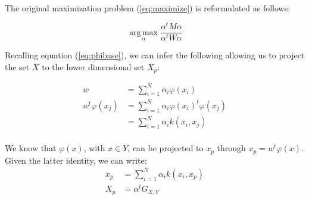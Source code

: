 \paragraph{}
The original maximization problem (\ref{eq:maximize}) is reformulated as follows:

\begin{equation*}
\label{eq:maximize2}
\operatorname*{arg\,max}_\alpha \frac{\alpha^t M \alpha}{\alpha^t W \alpha}
\end{equation*}

Recalling equation (\ref{eq:phibase}), we can infer the following allowing us to project the set $X$ to the
lower dimensional set $X_p$:

\begin{align*}
  w &= \sum_{i=1}^N \alpha_i \varphi(x_i) \\
  w^t \varphi(x_j) &= \sum_{i = 1}^N \alpha_i \varphi(x_i)^t \varphi(x_j)\\
                   &= \sum_{i = 1}^N \alpha_i k(x_i, x_j) \\
\end{align*}

We know that $\varphi(x)$, with $x \in Y$, can be projected to $x_p$ through $x_p = w^t \varphi(x)$.
Given the latter identity, we can write:
\begin{align*}
x_p &= \sum_{i = 1}^N \alpha_i k(x_i, x_p) \\
X_p &= \alpha^t G_{X,Y} \\
\end{align*}
